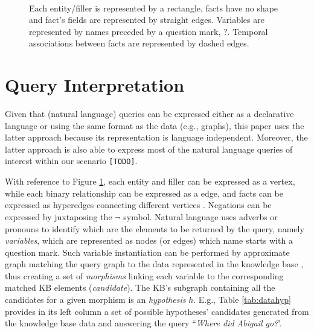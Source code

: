 \begin{figure}
	\\
	\caption{Each entity/filler is represented by a rectangle, facts have no shape and fact's fields are represented by straight edges. Variables are represented by names preceded by a question mark, ?. Temporal associations between facts are represented by dashed edges.}
	\label{fig:querygraph} 
\end{figure}


\section{Query Interpretation}\label{sec:querinterp}
Given that (natural language) queries can be expressed either as a declarative language \cite{Li16,Saha16} or using the same format as the data \cite{Hu0YWZ18,Consens90} (e.g., graphs), this paper uses the latter approach because its representation is language independent. Moreover, the latter approach is also able to express most of the natural language queries of interest within our scenario \texttt{[TODO]}. 

With reference to Figure \ref{fig:querygraph}, each entity and filler can be expressed as a vertex, while each binary relationship can be expressed as a edge, and facts can be expressed as hyperedges connecting different vertices \cite{Fagin83}. Negations can be expressed by juxtaposing the $\neg$ symbol. Natural language uses adverbs or pronouns to identify which are the elements to be returned by the query, namely \textit{variables}, which are represented as nodes (or edges) which name starts with a question mark.  Such variable instantiation can be performed by approximate graph matching the query graph to the data represented in the knowledge base \cite{DeVirgilio2015}, thus creating a set of \textit{morphisms} linking each variable to the corresponding matched KB elements (\textit{candidate}). The KB's subgraph containing all the candidates for a given morphism is an \textit{hypothesis} $h$.  E.g., Table \ref{tab:datahyp} provides in its left column a set of possible hypotheses' candidates generated from the knowledge base data and answering the query ``\textit{Where did Abigail go?}'. 

